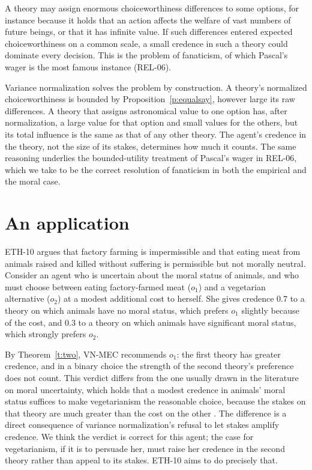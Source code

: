 \documentclass{situationist-preprint}
\begin{document}
A theory may assign enormous choiceworthiness differences to some options, for instance because it holds that an action affects the welfare of vast numbers of future beings, or that it has infinite value. If such differences entered expected choiceworthiness on a common scale, a small credence in such a theory could dominate every decision. This is the problem of fanaticism, of which Pascal's wager is the most famous instance (REL-06).

Variance normalization solves the problem by construction. A theory's normalized choiceworthiness is bounded by Proposition~\ref{p:equalsay}, however large its raw differences. A theory that assigns astronomical value to one option has, after normalization, a large value for that option and small values for the others, but its total influence is the same as that of any other theory. The agent's credence in the theory, not the size of its stakes, determines how much it counts. The same reasoning underlies the bounded-utility treatment of Pascal's wager in REL-06, which we take to be the correct resolution of fanaticism in both the empirical and the moral case.

\section{An application}

ETH-10 argues that factory farming is impermissible and that eating meat from animals raised and killed without suffering is permissible but not morally neutral. Consider an agent who is uncertain about the moral status of animals, and who must choose between eating factory-farmed meat ($o_1$) and a vegetarian alternative ($o_2$) at a modest additional cost to herself. She gives credence $0.7$ to a theory on which animals have no moral status, which prefers $o_1$ slightly because of the cost, and $0.3$ to a theory on which animals have significant moral status, which strongly prefers $o_2$.

By Theorem~\ref{t:two}, VN-MEC recommends $o_1$: the first theory has greater credence, and in a binary choice the strength of the second theory's preference does not count. This verdict differs from the one usually drawn in the literature on moral uncertainty, which holds that a modest credence in animals' moral status suffices to make vegetarianism the reasonable choice, because the stakes on that theory are much greater than the cost on the other \citep{MacAskillBykvistOrd2020}. The difference is a direct consequence of variance normalization's refusal to let stakes amplify credence. We think the verdict is correct for this agent; the case for vegetarianism, if it is to persuade her, must raise her credence in the second theory rather than appeal to its stakes. ETH-10 aims to do precisely that.
\end{document}
